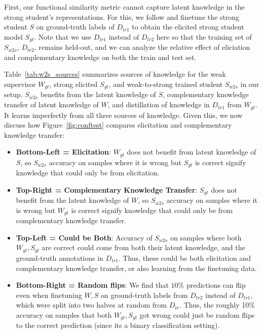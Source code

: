 First, our functional similarity metric cannot capture latent knowledge in the strong student's representations. For this, we follow \citet{burns2024weaktostrong} and finetune the strong student $S$ on ground-truth labels of $D_{tr1}$ to obtain the elicited strong student model $S_{gt}$. Note that we use $D_{tr1}$ instead of $D_{tr2}$ here so that the training set of $S_{w2s}$, $D_{tr2}$, remains held-out, and we can analyze the relative effect of eliciation and complementary knowledge on both the train and test set. 

Table~\ref{tab:w2s_sources} summarizes sources of knowledge for the weak supervisor $W_{gt}$, strong elicited $S_{gt}$, and weak-to-strong trained student $S_{w2s}$ in our setup. $S_{w2s}$ benefits from the latent knowledge of $S$, complementary knowledge transfer of latent knowledge of $W$, and distillation of knowledge in $D_{tr1}$ from $W_{gt}$. It learns imperfectly from all three sources of knowledge. Given this, we now discuss how Figure~\ref{fig:conftest} compares elicitation and complementary knowledge transfer: 
\begin{itemize}
    \item \textbf{Bottom-Left = Elicitation}: $W_{gt}$ does not benefit from latent knowledge of $S$, so $S_{w2s}$ accuracy on samples where it is wrong but $S_{gt}$ is correct signify knowledge that could only be from elicitation.
    \item \textbf{Top-Right = Complementary Knowledge Transfer}: $S_{gt}$ does not benefit from the latent knowledge of $W$, so $S_{w2s}$ accuracy on samples where it is wrong but $W_{gt}$ is correct signify knowledge that could only be from complementary knowledge transfer.
    \item \textbf{Top-Left = Could be Both}: Accuracy of $S_{w2s}$ on samples where both $W_{gt}, S_{gt}$ are correct could come from both their latent knowledge, and the ground-truth annotations in $D_{tr1}$. Thus, these could be both elicitation and complementary knowledge transfer, or also learning from the finetuning data.
    \item \textbf{Bottom-Right = Random flips}: We find that $10\%$ predictions can flip even when finetuning $W, S$ on ground-truth labels from $D_{tr2}$ instead of $D_{tr1}$, which were split into two halves at random from $D_{tr}$. Thus, the roughly 10\% accuracy on samples that both $W_{gt}, S_{gt}$ got wrong could just be random flips to the correct prediction (since its a binary classification setting). 
\end{itemize}

